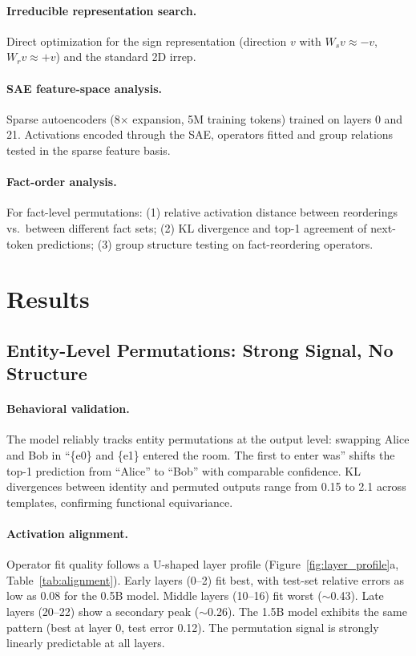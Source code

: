 \documentclass[10pt, letterpaper]{article}
\begin{document}
\paragraph{Irreducible representation search.} Direct optimization for the sign representation (direction $v$ with $W_s v \approx -v$, $W_r v \approx +v$) and the standard 2D irrep.

\paragraph{SAE feature-space analysis.} Sparse autoencoders (8$\times$ expansion, 5M training tokens) trained on layers 0 and 21. Activations encoded through the SAE, operators fitted and group relations tested in the sparse feature basis.

\paragraph{Fact-order analysis.} For fact-level permutations: (1) relative activation distance between reorderings vs.\ between different fact sets; (2) KL divergence and top-1 agreement of next-token predictions; (3) group structure testing on fact-reordering operators.

\section{Results}
\label{sec:results}

\subsection{Entity-Level Permutations: Strong Signal, No Structure}

\paragraph{Behavioral validation.} The model reliably tracks entity permutations at the output level: swapping Alice and Bob in ``\{e0\} and \{e1\} entered the room. The first to enter was'' shifts the top-1 prediction from ``Alice'' to ``Bob'' with comparable confidence. KL divergences between identity and permuted outputs range from 0.15 to 2.1 across templates, confirming functional equivariance.

\paragraph{Activation alignment.} Operator fit quality follows a U-shaped layer profile (Figure~\ref{fig:layer_profile}a, Table~\ref{tab:alignment}). Early layers (0--2) fit best, with test-set relative errors as low as 0.08 for the 0.5B model. Middle layers (10--16) fit worst ($\sim$0.43). Late layers (20--22) show a secondary peak ($\sim$0.26). The 1.5B model exhibits the same pattern (best at layer 0, test error 0.12). The permutation signal is strongly linearly predictable at all layers.
\end{document}
